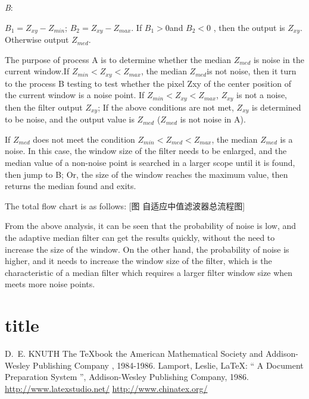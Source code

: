 \documentclass{mcmthesis}
\begin{document}
\emph{B}:

$B_1 = Z_{xy}−Z_{min}$;  
$B_2 = Z_{xy}−Z_{max}$.  
If $B_1>0$and $B_2<0$ , then the output is $Z_{xy}$.
Otherwise output $Z_{med}$.


The purpose of process A is to determine whether the median $Z_{med}$ is noise in the current window.If $Z_{min} < Z_{xy} < Z_{max}$, the median $Z_{med}$is not noise, then it turn to the process B testing to test whether the pixel Zxy of the center position of the current window is a noise point.
If $Z_{min} < Z_{xy} < Z_{max}$, $Z_{xy}$ is not a noise, then the filter output $Z_{xy}$; If the above conditions are not met, $Z_{xy}$ is determined to be noise, and the output value is $Z_{med}$ ($Z_{med}$ is not noise in A).

If $Z_{med}$ does not meet the condition $Z_{min}<Z_{med}<Z_{max}$, the median $Z_{med}$ is a noise. In this case, the window size of the filter needs to be enlarged, and the median value of a non-noise point is searched in a larger scope until it is found, then jump to B; Or, the size of the window reaches the maximum value, then returns the median found and exits.

The total flow chart is as follows:
[图  自适应中值滤波器总流程图]

From the above analysis, it can be seen that the probability of noise is low, and the adaptive median filter can get the results quickly, without the need to increase the size of the window. On the other hand, the probability of noise is higher, and it needs to increase the window size of the filter, which is the characteristic of a median filter which requires a larger filter window size when meets more noise points.

\section{title}
\begin{thebibliography}{99}
 D.~E. KNUTH   The \TeX{}book  the American
Mathematical Society and Addison-Wesley
Publishing Company , 1984-1986.
Lamport, Leslie,  \LaTeX{}: `` A Document Preparation System '',
Addison-Wesley Publishing Company, 1986.
\url{http://www.latexstudio.net/}
\url{http://www.chinatex.org/}
\end{thebibliography}
\end{document}
